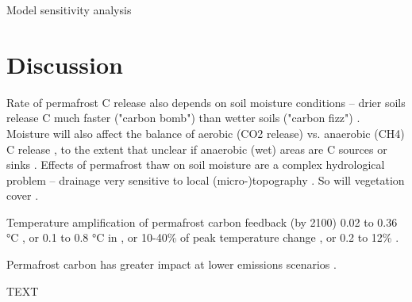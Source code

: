 \documentclass[essd, manuscript]{copernicus}
\begin{document}
Model sensitivity analysis

\section{Discussion}
Rate of permafrost C release also depends on soil moisture conditions -- drier soils release C much faster ("carbon bomb") than wetter soils ("carbon fizz") \citep{elberling_2013_long}.
Moisture will also affect the balance of aerobic (CO2 release) vs. anaerobic (CH4) C release \citep{turetsky_2002_boreal}, to the extent that unclear if anaerobic (wet) areas are C sources or sinks \citep{wickland_2006_effects}.
Effects of permafrost thaw on soil moisture are a complex hydrological problem -- drainage very sensitive to local (micro-)topography \citep{wickland_2006_effects}.
So will vegetation cover \citep{wickland_2006_effects}.

Temperature amplification of permafrost carbon feedback (by 2100) 0.02 to 0.36 °C \citep{burke_2013_estimating; schneider_2012_estimating; schneider_2015_observation}, or 0.1 to 0.8 °C in \citep{macdougall_2012_significant; macdougall_2013_if}, or 10-40\% of peak temperature change \citep{crichton_2016_permafrost}, or 0.2 to 12\% \citep{burke_2017_quantifying}.

Permafrost carbon has greater impact at lower emissions scenarios \citep{burke_2017_quantifying; @macdougall_2012_significant; @macdougall_2013_if} .


\conclusions  %
TEXT










\end{document}
